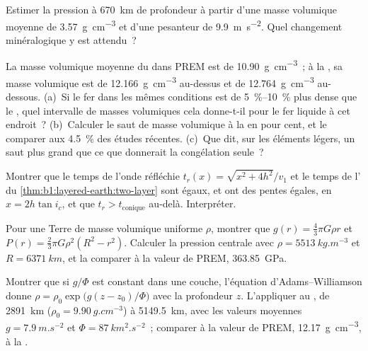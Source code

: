 \begin{exercise}[$\star\star$]\label{exo:b1:layered-earth:8}
Estimer la pression à \qty{670}{km} de profondeur à partir d'une masse volumique
moyenne de \qty{3.57}{g.cm^{-3}} et d'une pesanteur de \qty{9.9}{m.s^{-2}}. Quel
changement minéralogique y est attendu~?
\end{exercise}

\begin{exercise}[$\star\star$]\label{exo:b1:layered-earth:9}
La masse volumique moyenne du  dans PREM est de
\qty{10.90}{g.cm^{-3}}~; à la , sa masse volumique est de
\qty{12.166}{g.cm^{-3}} au-dessus et de \qty{12.764}{g.cm^{-3}} au-dessous.
(a)~Si le fer dans les mêmes conditions est de \qtyrange{5}{10}{\percent} plus
dense que le , quel intervalle de masses volumiques cela donne-t-il
pour le fer liquide à cet endroit~? (b)~Calculer le saut de masse volumique à la
 en pour cent, et le comparer aux \qty{4.5}{\percent} des
études récentes. (c)~Que dit, sur les éléments légers, un saut plus grand que ce
que donnerait la congélation seule~?
\end{exercise}

\begin{exercise}[$\star\star\star$]\label{exo:b1:layered-earth:10}
Montrer que le temps de l'onde réfléchie $t_r(x) = \sqrt{x^2 + 4h^2}/v_1$ et le
temps de l' du \cref{thm:b1:layered-earth:two-layer} sont égaux, et
ont des pentes égales, en $x = 2h\tan i_c$, et que $t_r > t_{\text{conique}}$
au-delà. Interpréter.
\end{exercise}

\begin{exercise}[$\star\star\star$]\label{exo:b1:layered-earth:11}
Pour une Terre de masse volumique uniforme $\rho$, montrer que
$g(r) = \tfrac43\pi G\rho r$ et $P(r) = \tfrac23\pi G\rho^2(R^2 - r^2)$. Calculer la
pression centrale avec $\rho = \qty{5513}{kg.m^{-3}}$ et $R = \qty{6371}{km}$, et la
comparer à la valeur de PREM, \qty{363.85}{GPa}.
\end{exercise}

\begin{exercise}[$\star\star\star$]\label{exo:b1:layered-earth:12}
Montrer que si $g/\Phi$ est constant dans une couche, l'équation d'Adams--Williamson
donne $\rho = \rho_0\exp\bigl(g(z - z_0)/\Phi\bigr)$ avec la profondeur $z$.
L'appliquer au , de \qty{2891}{km} ($\rho_0 =
\qty{9.90}{g.cm^{-3}}$) à \qty{5149.5}{km}, avec les valeurs moyennes
$g = \qty{7.9}{m.s^{-2}}$ et $\Phi = \qty{87}{km^2.s^{-2}}$~; comparer à la valeur
de PREM, \qty{12.17}{g.cm^{-3}}, à la .
\end{exercise}

